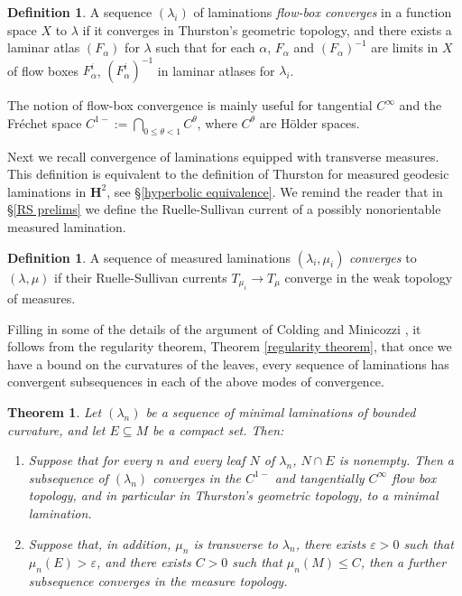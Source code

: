 \documentclass[reqno,11pt]{amsart}
\newcommand{\Hyp}{\mathbf H}
\newcommand{\dfn}[1]{\emph{#1}\index{#1}}
\newtheorem{mainthm}{Theorem}
\theoremstyle{definition}
\newtheorem{definition}[theorem]{Definition}
\numberwithin{equation}{section}
\begin{document}
\begin{definition}
A sequence $(\lambda_i)$ of laminations \dfn{flow-box converges} in a function space $X$ to $\lambda$ if it converges in Thurston's geometric topology, and there exists a laminar atlas $(F_\alpha)$ for $\lambda$ such that for each $\alpha$, $F_\alpha$ and $(F_\alpha)^{-1}$ are limits in $X$ of flow boxes $F_\alpha^i$, $(F_\alpha^i)^{-1}$ in laminar atlases for $\lambda_i$.
\end{definition}

The notion of flow-box convergence is mainly useful for tangential $C^\infty$ and the Fr\'echet space $C^{1-} := \bigcap_{0 \leq \theta < 1} C^\theta$, where $C^\theta$ are H\"older spaces.

Next we recall convergence of laminations equipped with transverse measures.
This definition is equivalent to the definition of Thurston for measured geodesic laminations in $\Hyp^2$, see \S\ref{hyperbolic equivalence}.
We remind the reader that in \S\ref{RS prelims} we define the Ruelle-Sullivan current of a possibly nonorientable measured lamination.

\begin{definition}
A sequence of measured laminations $(\lambda_i, \mu_i)$ \dfn{converges} to $(\lambda, \mu)$ if their Ruelle-Sullivan currents $T_{\mu_i} \to T_\mu$ converge in the weak topology of measures.
\end{definition}

Filling in some of the details of the argument of Colding and Minicozzi \cite[Appendix B]{ColdingMinicozziIV}, it follows from the regularity theorem, Theorem \ref{regularity theorem}, that once we have a bound on the curvatures of the leaves, every sequence of laminations has convergent subsequences in each of the above modes of convergence.

\begin{mainthm}\label{compactness theorem}
Let $(\lambda_n)$ be a sequence of minimal laminations of bounded curvature, and let $E \subseteq M$ be a compact set. Then:
\begin{enumerate}
\item Suppose that for every $n$ and every leaf $N$ of $\lambda_n$, $N \cap E$ is nonempty. Then a subsequence of $(\lambda_n)$ converges in the $C^{1-}$ and tangentially $C^\infty$ flow box topology, and in particular in Thurston's geometric topology, to a minimal lamination.
\item Suppose that, in addition, $\mu_n$ is transverse to $\lambda_n$, there exists $\varepsilon > 0$ such that $\mu_n(E) > \varepsilon$, and there exists $C > 0$ such that $\mu_n(M) \leq C$, then a further subsequence converges in the measure topology.
\end{enumerate}
\end{mainthm}
\end{document}
